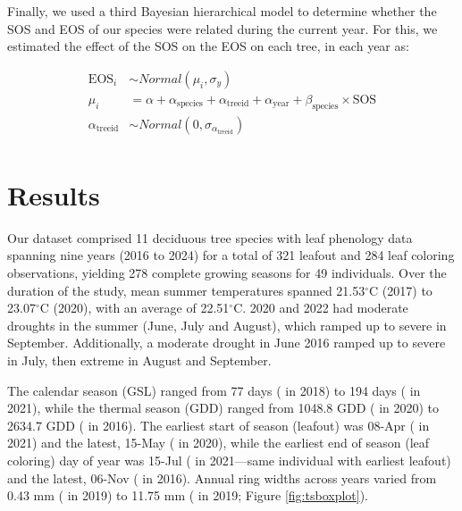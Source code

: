\documentclass{article}\usepackage[]{graphicx}\usepackage[]{xcolor}
\begin{document}
Finally, we used a third Bayesian hierarchical model to determine whether the SOS and EOS of our species were related during the current year. For this, we estimated the effect of the SOS on the EOS on each tree, in each year as: 

\begin{equation}
\begin{aligned}
\text{EOS}_i &\sim Normal(\mu_i, \sigma_y) \\
\mu_i &= \alpha + \alpha_{\text{species}} + \alpha_{\text{treeid}} + \alpha_{\text{year}} + \beta_{\text{species}} \times \text{SOS} \\[4pt]
\alpha_{\text{treeid}} &\sim Normal(0, \sigma_{\alpha_{\text{treeid}}}) \\
\end{aligned}
\label{eq:SOSonEOSMdl}
\end{equation}

\section{Results}

Our dataset comprised 11 deciduous tree species with leaf phenology data spanning nine years (2016 to 2024) for a total of 
321 leafout and 
284 leaf coloring
observations, yielding 
278 complete growing seasons for 
49 individuals. Over the duration of the study, mean summer temperatures spanned 
21.53$^\circ$C 
(2017) to 
23.07$^\circ$C 
(2020), with an average of
22.51$^\circ$C. 2020 and 2022 had moderate droughts in the summer (June, July and August), which ramped up to severe in September. Additionally, a moderate drought in June 2016 ramped up to severe in July, then extreme in August and September. 

The calendar season (GSL) ranged from 
77 days ({\Afla} in 
2018) to 
194 days ({\Asac} in 
2021), while the thermal season (GDD) ranged from 
1048.8 GDD ({\Afla} in 
2020) to 
2634.7 GDD ({\Tame} in 
2016). The earliest start of season (leafout) was 
08-Apr ({\Afla} in 
2021) and the latest, 
15-May ({\Cova} in 
2020), while the earliest end of season (leaf coloring) day of year was
15-Jul ({\Afla} in 
2021---same individual with earliest leafout) and the latest, 
06-Nov ({\Tame} in
2016). Annual ring widths across years varied from 
0.43 mm ({\Asac} in 2019) to 
11.75 mm ({\Tame} in 2019; Figure \ref{fig:tsboxplot}). 
\end{document}
